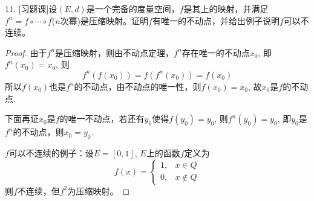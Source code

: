 \documentclass[a4paper,8pt]{ctexart}\textwidth 140mm \textheight 216mm
\newcommand{\8}{\infty}
\begin{document}
11. [习题课]设$(E,d)$是一个完备的度量空间，$f$是其上的映射，并满足$f^n=f\circ\cdots\circ f$($n$次幂)是压缩映射。证明$f$有唯一的不动点，并给出例子说明$f$可以不连续。
\begin{proof}
	由于$f^n$是压缩映射，则由不动点定理，$f^n$存在唯一的不动点$x_0$, 即$f^n(x_0)=x_0$, 则
	$$f^n(f(x_0))=f(f^n(x_0))=f(x_0)$$
	所以$f(x_0)$也是$f^n$的不动点，由不动点的唯一性，则$f(x_0)=x_0$, 故$x_0$是$f$的不动点. 
	
	下面再证$x_0$是$f$的唯一不动点，若还有$y_0$使得$f(y_0)=y_0$, 则$f^n(y_0)=y_0$, 即$y_0$是$f^n$的不动点，则$x_0=y_0$.
	
	$f$可以不连续的例子：设$E=[0,1]$, $E$上的函数$f$定义为
	\[f(x)=\begin{cases}
	1, & x\in Q\\
	0, & x\notin Q
	\end{cases}\]
	则$f$不连续，但$f^2$为压缩映射。
\end{proof}
\end{document}
